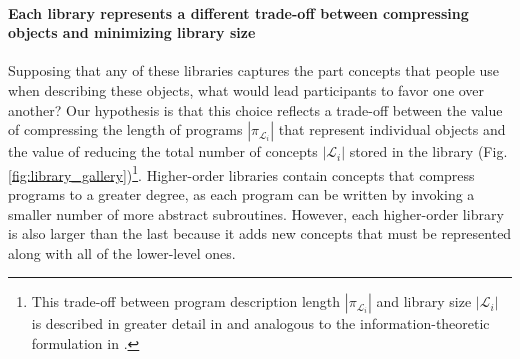 \documentclass[10pt,letterpaper]{article}
\begin{document}
\paragraph{Each library represents a different trade-off between compressing objects and minimizing library size} 
Supposing that any of these libraries captures the part concepts that people use when describing these objects, what would lead participants to favor one over another? Our hypothesis is that this choice reflects a trade-off between the value of compressing the length of programs $|\pi_{\mathcal{L}_i}|$ that represent individual objects and the value of reducing the total number of concepts $|\mathcal{L}_i|$ stored in the library (Fig. \ref{fig:library_gallery})\footnote{This trade-off between program description length $|\pi_{\mathcal{L}_i}|$ and library size $|\mathcal{L}_i|$ is described in greater detail in  and analogous to the information-theoretic formulation in .}.
Higher-order libraries contain concepts that compress programs to a greater degree, as each program can be written by invoking a smaller number of more abstract subroutines.
However, each higher-order library is also larger than the last because it adds new concepts that must be represented along with all of the lower-level ones.



\end{document}
